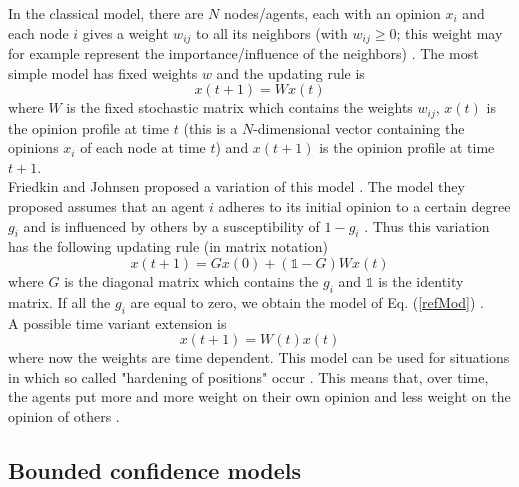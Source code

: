 \documentclass[11 pt , letterpaper , twoside , openright]{book}
\begin{document}
In the classical model, there are $N$ nodes/agents, each with an opinion $x_i$ and each node $i$ gives a weight $w_{ij}$ to all its neighbors (with $w_{ij} \geqslant 0$; this weight may for example represent the importance/influence of the neighbors) \cite{Krause2002}. The most simple model has fixed weights $w$ and the updating rule is \cite{Krause2002}
\begin{equation}\label{refMod}
	x(t+1) = W x(t)
\end{equation}
where $W$ is the fixed stochastic matrix which contains the weights $w_{ij}$, $x(t)$ is the opinion profile at time $t$ (this is a $N$-dimensional vector containing the opinions $x_i$ of each node at time $t$) and $x(t+1)$ is the opinion profile at time $t+1$.\\
Friedkin and Johnsen proposed a variation of this model \cite{Friedkin1990}\cite{Friedkin1999}. The model they proposed assumes that an agent $i$ adheres to its initial opinion to a certain degree $g_i$ and is influenced by others by a susceptibility of $1-g_i$ \cite{Krause2002}. Thus this variation has the following updating rule (in matrix notation) \cite{Krause2002}
\begin{equation}
	x(t+1) = Gx(0) + (\mathbb{1}-G)Wx(t)
\end{equation}
where $G$ is the diagonal matrix which contains the $g_i$ and $\mathbb{1}$ is the identity matrix. If all the $g_i$ are equal to zero, we obtain the model of Eq. (\ref{refMod}) \cite{Krause2002}.\\
A possible time variant extension is \cite{Krause2002}
\begin{equation}
	x(t+1) = W(t)x(t)
\end{equation}
where now the weights are time dependent. This model can be used for situations in which so called "hardening of positions" occur \cite{Krause2002}. This means that, over time, the agents put more and more weight on their own opinion and less weight on the opinion of others \cite{Krause2002}. 

\subsection{Bounded confidence models}
\end{document}
